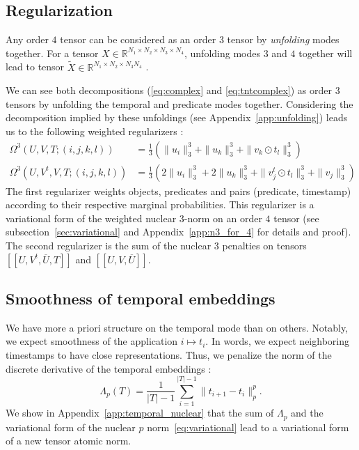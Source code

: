 \documentclass{article}
\def\RR{\mathbb{R}}
\newcommand{\brck}[1]{[\![#1]\!]}
\begin{document}
\subsection{Regularization}
\label{sec:reg}
Any order $4$ tensor can be considered as an order $3$ tensor by \emph{unfolding} modes together. For a tensor $X \in \RR^{N_1\times N_2 \times N_3 \times N_4}$, unfolding modes $3$ and $4$ together will lead to tensor $\tilde{X}\in \RR^{N_1\times N_2\times N_3N_4}$ \citep{kolda_tensor_2009}.

We can see both decompositions (\eqref{eq:complex} and \eqref{eq:tntcomplex}) as order $3$ tensors by unfolding the temporal and predicate modes together. Considering the decomposition implied by these unfoldings (see Appendix~\ref{app:unfolding}) leads us to the following weighted regularizers \citep{lacroix2018canonical}:
\begin{align}
    \Omega^{3}(U, V, T; (i,j,k,l)) &= \frac{1}{3}\left(\|u_i\|_3^3 + \|u_k\|_3^3 + \|v_k\odot t_l\|_3^3\right) \label{eq:4_as_3}\\
    \Omega^{3}(U, V^t, V, T; (i,j,k,l)) &= \frac{1}{3}\left(2\|u_i\|_3^3 + 2\|u_k\|_3^3 + \|v_j^t\odot t_l\|_3^3 + \|v_j\|_3^3\right)
\end{align}
The first regularizer weights objects, predicates and pairs (predicate, timestamp) according to their respective marginal probabilities. This regularizer is a variational form of the weighted nuclear $3$-norm on an order $4$ tensor (see subsection~\ref{sec:variational} and Appendix~\ref{app:n3_for_4} for details and proof).
The second regularizer is the sum of the nuclear $3$ penalties on tensors $\brck{U,V^t, \overline{U}, T}$ and $\brck{U,V, \overline{U}}$.

\subsection{Smoothness of temporal embeddings}
\label{sec:grad_penalty}
We have more a priori structure on the temporal mode than on others. Notably, we expect smoothness of the application $i \mapsto t_{i}$. In words, we expect neighboring timestamps to have close representations. Thus, we penalize the norm of the discrete derivative of the temporal embeddings :
\begin{equation}
    \Lambda_p(T) = \frac{1}{|T| - 1}\sum_{i=1}^{|T|-1}\|t_{i+1} - t_i\|_p^p.
    \label{eq:temporal_reg}
\end{equation}
We show in Appendix~\ref{app:temporal_nuclear} that the sum of $\Lambda_p$ and the variational form of the nuclear $p$ norm~\eqref{eq:variational} lead to a variational form of a new tensor atomic norm.
\end{document}
